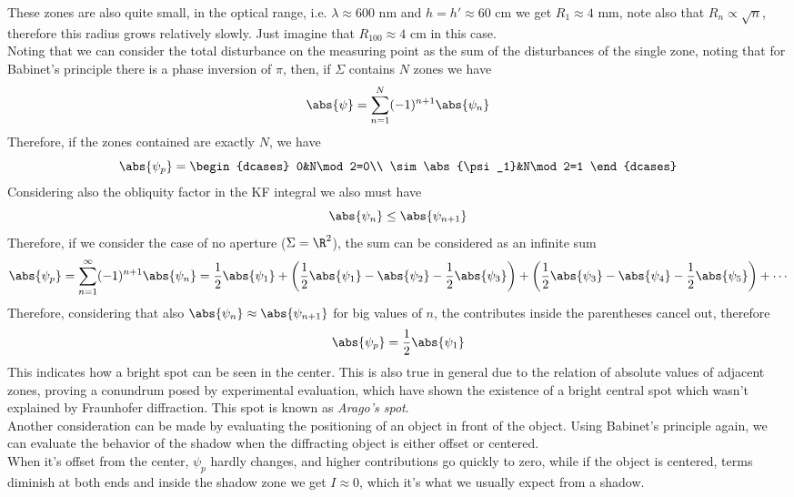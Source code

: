 \documentclass[../electromagnetism.tex]{subfiles}
\begin{document}
These zones are also quite small, in the optical range, i.e. $\lambda\approx600$ nm and $h=h'\approx60$ cm we get $R_1\approx4$ mm, note also that $R_n\propto\sqrt{n}$, therefore this radius grows relatively slowly. Just imagine that $R_{100}\approx4$ cm in this case.\\
Noting that we can consider the total disturbance on the measuring point as the sum of the disturbances of the single zone, noting that for Babinet's principle there is a phase inversion of $\pi$, then, if $\Sigma$ contains $N$ zones we have
\begin{equation}
	\abs{\psi}=\sum^N_{n=1}(-1)^{n+1}\abs{\psi_n}
	\label{eq:fresneldisturbance.diff}
\end{equation}
Therefore, if the zones contained are exactly $N$, we have
\begin{equation*}
	\abs{\psi_p}=\begin{dcases}
		0&N\mod2=0\\
		\sim\abs{\psi_1}&N\mod2=1
	\end{dcases}
\end{equation*}
Considering also the obliquity factor in the KF integral we also must have
\begin{equation*}
	\abs{\psi_n}\le\abs{\psi_{n+1}}
\end{equation*}
Therefore, if we consider the case of no aperture ($\Sigma=\R^2$), the sum can be considered as an infinite sum
\begin{equation}
	\abs{\psi_p}=\sum_{n=1}^\infty(-1)^{n+1}\abs{\psi_n}=\frac{1}{2}\abs{\psi_1}+\left( \frac{1}{2}\abs{\psi_1}-\abs{\psi_2}-\frac{1}{2}\abs{\psi_3} \right)+\left( \frac{1}{2}\abs{\psi_3}-\abs{\psi_4}-\frac{1}{2}\abs{\psi_5} \right)+\cdots
	\label{eq:infinitezones.diff}
\end{equation}
Therefore, considering that also $\abs{\psi_n}\approx\abs{\psi_{n+1}}$ for big values of $n$, the contributes inside the parentheses cancel out, therefore
\begin{equation*}
	\abs{\psi_p}=\frac{1}{2}\abs{\psi_1}
\end{equation*}
This indicates how a bright spot can be seen in the center. This is also true in general due to the relation of absolute values of adjacent zones, proving a conundrum posed by experimental evaluation, which have shown the existence of a bright central spot which wasn't explained by Fraunhofer diffraction. This spot is known as \textit{Arago's spot}.\\
Another consideration can be made by evaluating the positioning of an object in front of the object. Using Babinet's principle again, we can evaluate the behavior of the shadow when the diffracting object is either offset or centered.\\
When it's offset from the center, $\psi_p$ hardly changes, and higher contributions go quickly to zero, while if the object is centered, terms diminish at both ends and inside the shadow zone we get $I\approx0$, which it's what we usually expect from a shadow.\\
\end{document}
